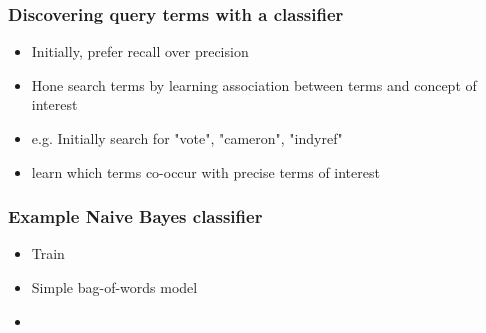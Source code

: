 \documentclass[11pt, table, dvipsnames]{beamer}
\begin{document}
\begin{frame}
  \frametitle{Discovering query terms with a classifier}
  \begin{itemize}
  \item Initially, prefer recall over precision
  \item Hone search terms by learning association between terms and concept of interest
  \item e.g. Initially search for "vote", "cameron", "indyref"
  \item learn which terms co-occur with precise terms of interest
  \end{itemize}
\end{frame}

\begin{frame}
  \frametitle{Example Naive Bayes classifier}
  \begin{itemize}
  \item Train 
  \item Simple bag-of-words model
  \item 
  \end{itemize}
\end{frame}
\end{document}
